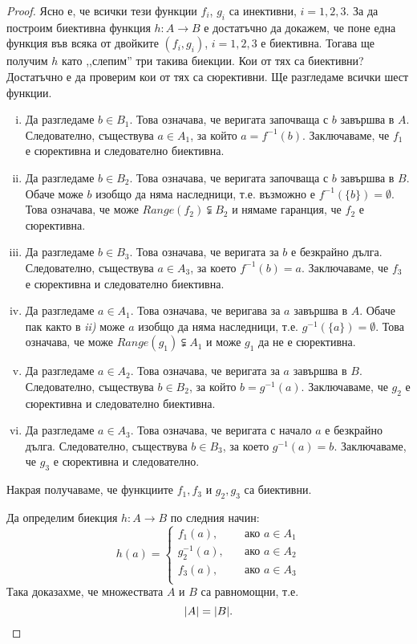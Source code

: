 \begin{proof}
Ясно е, че всички тези функции $f_i$, $g_i$ са инективни, $i = 1,2,3$.
За да построим биективна функция $h:A\to B$ е достатъчно да докажем, че 
поне една функция във всяка от двойките $(f_i,g_i)$, $i = 1,2,3$ е биективна.
Тогава ще получим $h$ като ,,слепим'' три такива биекции.
Кои от тях са биективни? Достатъчно е да проверим кои от тях са сюрективни.
Ще разгледаме всички шест функции.
\begin{enumerate}[i)]
\item 
  Да разгледаме $b \in B_1$. Това означава, че веригата започваща с $b$
  завършва в $A$. Следователно, съществува 
  $a \in A_1$, за който $a = f^{-1}(b)$.
  Заключаваме, че $f_1$ е сюрективна и следователно биективна.
\item
  Да разгледаме $b \in B_2$. Това означава, че веригата започваща с $b$
  завършва в $B$.
  Обаче може $b$ изобщо да няма наследници, т.е.
  възможно е $f^{-1}(\{b\}) = \emptyset$.
  Това означава, че може $Range(f_2) \subsetneqq B_2$ и
  нямаме гаранция, че $f_2$ е сюрективна.
\item
  Да разгледаме $b \in B_3$. Това означава, че веригата за $b$
  е безкрайно дълга.
  Следователно, съществува $a \in A_3$, за което $f^{-1}(b) = a$.
  Заключаваме, че $f_3$ е сюрективна и следователно биективна.
\item
  Да разгледаме $a \in A_1$. Това означава, че веригава за $a$
  завършва в $A$. 
  Обаче пак както в {\em ii)} може $a$ изобщо да няма наследници, т.е.
  $g^{-1}(\{a\}) = \emptyset$.
  Това означава, че може $Range(g_1) \subsetneqq A_1$ и 
  може $g_1$ да не е сюрективна.
\item
  Да разгледаме $a \in A_2$. Това означава, че веригата за $a$ завършва в  $B$.
  Следователно, съществува $b \in B_2$, за който $b = g^{-1}(a)$.
  Заключаваме, че $g_2$ е сюрективна и следователно биективна.
\item
  Да разгледаме $a \in A_3$. Това означава, че веригата с начало $a$ е безкрайно дълга.
  Следователно, съществува $b \in B_3$, за което $g^{-1}(a) = b$.
  Заключаваме, че $g_3$ е сюрективна и следователно.
\end{enumerate}

Накрая получаваме, че функциите $f_1,f_3$ и $g_2,g_3$ са биективни.

Да определим биекция $h:A\rightarrow B$ по следния начин:
\[
h(a) =
\begin{cases}
  f_1(a),     & \quad \text{ако $a\in A_1$}\\
  g^{-1}_2(a), & \quad \text{ако $a\in A_2$}\\
  f_3(a),     & \quad \text{ако $a\in A_3$}\\
\end{cases}
\]
Така доказахме, че множествата $A$ и $B$ са равномощни, т.е.
\[\lvert{A}\rvert = \lvert{B}\rvert.\]
\end{proof}

